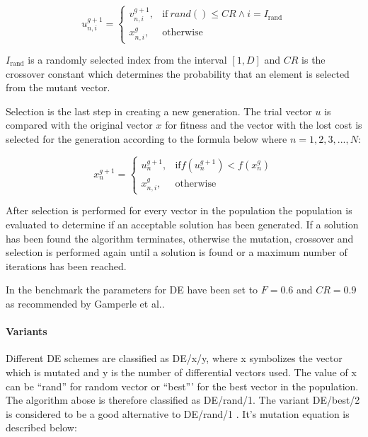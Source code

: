 \begin{equation}
    u_{n,i}^{g+1} =
    \begin{cases}
      v_{n,i}^{g+1}, & \text{if}\ rand() \leq CR \wedge i = I_{\text{rand}} \\
      x_{n,i}^{g}, & \text{otherwise}
\end{cases}
\end{equation}

$I_{\text{rand}}$ is a randomly selected index from the interval $[1,D]$ and $CR$ is the crossover constant which determines the probability that an element is selected from the mutant vector.

Selection is the last step in creating a new generation. The trial vector $u$ is compared with the original vector $x$ for fitness and the vector with the lost cost is selected for the generation according to the formula below where $n=1,2,3,...,N$:

\begin{equation}
    x_{n}^{g+1} =
    \begin{cases}
      u_{n}^{g+1}, & \text{if} f(u_{n}^{g+1}) < f(x_{n}^{g}) \\
      x_{n,i}^{g}, & \text{otherwise}
\end{cases}
\end{equation}

After selection is performed for every vector in the population the population is evaluated to determine if an acceptable solution has been generated. If a solution has been found the algorithm terminates, otherwise the mutation, crossover and selection is performed again until a solution is found or a maximum number of iterations has been reached.

In the benchmark the parameters for DE have been set to $F = 0.6$ and $CR=0.9$ as recommended by Gamperle et al.\cite{gamperle2002parameter}.

\paragraph{Variants}

Different DE schemes are classified as DE/x/y, where x symbolizes the vector which is mutated and y is the number of differential vectors used. The value of x can be ``rand'' for random vector or ``best''' for the best vector in the population. The algorithm abose is therefore classified as DE/rand/1. The variant DE/best/2 is considered to be a good alternative to DE/rand/1 \cite{qin2009differential}. It's mutation equation is described below:

